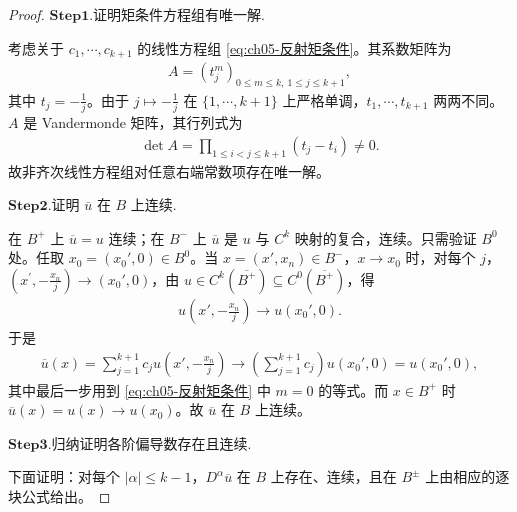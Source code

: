 \documentclass[../../main.tex]{subfiles}
\begin{document}
\begin{proof}
\noindent$\mathbf{Step}\bm{1}$.{\heiti 证明矩条件方程组有唯一解.}

考虑关于 $c_1,\cdots,c_{k+1}$ 的线性方程组 \eqref{eq:ch05-反射矩条件}。其系数矩阵为
\begin{align*}
A=\left(t_j^{m}\right)_{0\leqslant m\leqslant k,\ 1\leqslant j\leqslant k+1},
\end{align*}
其中 $t_j=-\frac{1}{j}$。由于 $j\mapsto-\frac{1}{j}$ 在 $\{1,\cdots,k+1\}$ 上严格单调，$t_1,\cdots,t_{k+1}$ 两两不同。$A$ 是 Vandermonde 矩阵，其行列式为
\begin{align*}
\det A=\prod_{1\leqslant i<j\leqslant k+1}(t_j-t_i)\neq0.
\end{align*}
故非齐次线性方程组对任意右端常数项存在唯一解。

\noindent$\mathbf{Step}\bm{2}$.{\heiti 证明 $\overline{u}$ 在 $B$ 上连续.}

在 $B^{+}$ 上 $\overline{u}=u$ 连续；在 $B^{-}$ 上 $\overline{u}$ 是 $u$ 与 $C^{k}$ 映射的复合，连续。只需验证 $B^{0}$ 处。任取 $x_0=(x_0',0)\in B^{0}$。当 $x=(x',x_n)\in B^{-}$，$x\to x_0$ 时，对每个 $j$，$\left( x^{\prime},-\frac{x_n}{j} \right) \to(x_0',0)$，由 $u\in C^{k}(\overline{B^{+}})\subseteq C^{0}(\overline{B^{+}})$，得
\begin{align*}
u\left(x',-\frac{x_n}{j}\right)\longrightarrow u(x_0',0).
\end{align*}
于是
\begin{align*}
\overline{u}(x)=\sum_{j=1}^{k+1}c_j u\left(x',-\frac{x_n}{j}\right)
\longrightarrow\left(\sum_{j=1}^{k+1}c_j\right)u(x_0',0)=u(x_0',0),
\end{align*}
其中最后一步用到 \eqref{eq:ch05-反射矩条件} 中 $m=0$ 的等式。而 $x\in B^{+}$ 时 $\overline{u}(x)=u(x)\to u(x_0)$。故 $\overline{u}$ 在 $B$ 上连续。

\noindent$\mathbf{Step}\bm{3}$.{\heiti 归纳证明各阶偏导数存在且连续.}

下面证明：对每个 $|\alpha|\leqslant k-1$，$D^{\alpha}\overline{u}$ 在 $B$ 上存在、连续，且在 $B^{\pm}$ 上由相应的逐块公式给出。


\end{proof}
\end{document}
